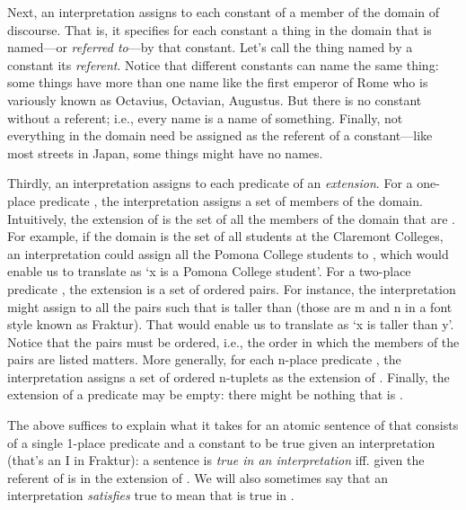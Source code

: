 Next, an interpretation assigns to each constant of \lL[Q]{} a member of the domain of 
discourse.  That is, it specifies for each constant a thing in the domain that 
is named---or \emph{referred to}---by that constant. Let's call the thing named 
by a constant its \emph{referent}.  Notice that different constants can name the 
same thing: some things have more than one name like the first emperor of Rome 
who is variously known as Octavius, Octavian, Augustus.  But there is no 
constant without a referent; i.e., every name is a name of something.  Finally,  
not everything in the domain need be assigned as the referent of a 
constant---like most streets in Japan, some things might have no names.

Thirdly, an interpretation assigns to each predicate of \lL[Q]{} an 
\emph{extension}. For a one-place predicate , the interpretation 
assigns a set of members of the domain. Intuitively, the extension of 
 is the set of all the members of the domain that are 
. For example, if the domain is the set of all students at the 
Claremont Colleges, an interpretation could assign all the Pomona College 
students to , which would enable us to translate  as `x is a Pomona 
College student'. For a two-place predicate , the extension is a set of 
ordered pairs. For instance, the interpretation might assign to  all the 
pairs  such that  is taller than 
 (those are m and n in a font style known as Fraktur). That 
would enable us to translate  as `x is taller than y'. Notice that the 
pairs must be ordered, i.e., the order in which the members of the pairs are 
listed matters.  More generally, for each n-place predicate , the 
interpretation assigns a set of ordered n-tuplets as the extension of 
.  Finally, the extension of a predicate may be empty: there might 
be nothing that is .

The above suffices to explain what it takes for an atomic sentence of \lL[Q]
{} that consists of a single 1-place predicate and a constant  to be true given 
an interpretation  (that's an I in Fraktur): a sentence 
 is \emph{true in an interpretation }  iff.  given  
the referent of \p{\kappa} is in the extension of .   We will also 
sometimes say that  an interpretation  \emph{satisfies}  
 true to mean that  is true in 
.
 
